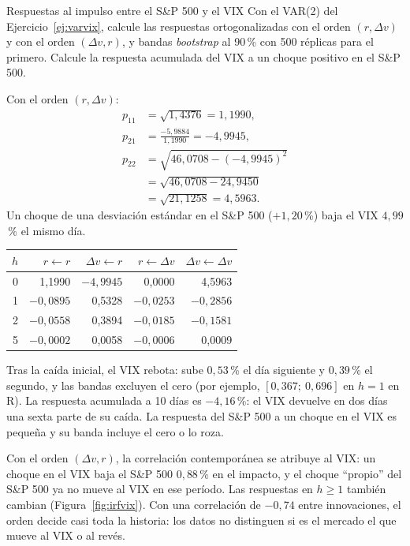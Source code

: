 \begin{ejresuelto}{Respuestas al impulso entre el S\&P 500 y el VIX}\label{ej:irfvix}
\enunciado Con el VAR(2) del Ejercicio~\ref{ej:varvix}, calcule las respuestas ortogonalizadas con el orden
$(r,\Delta v)$ y con el orden $(\Delta v,r)$, y bandas \emph{bootstrap} al 90\,\% con 500 réplicas para el
primero. Calcule la respuesta acumulada del VIX a un choque positivo en el S\&P 500.

\solucion
{} Con el orden $(r,\Delta v)$:
\begin{align*}
  p_{11} &= \sqrt{1{,}4376}=1{,}1990,\\
  p_{21} &= \frac{-5{,}9884}{1{,}1990}=-4{,}9945,\\
  p_{22} &= \sqrt{46{,}0708-(-4{,}9945)^2}\\
         &= \sqrt{46{,}0708-24{,}9450}\\
         &= \sqrt{21{,}1258}=4{,}5963 .
\end{align*}
Un choque de una desviación estándar en el S\&P 500 ($+1{,}20$\,\%) baja el VIX $4{,}99$\,\% el mismo día.

\begin{center}\small
\begin{tabular}{@{}rrrrr@{}}
\toprule
$h$ & $r\leftarrow r$ & $\Delta v\leftarrow r$ & $r\leftarrow\Delta v$ & $\Delta v\leftarrow\Delta v$ \\
\midrule
0  & 1,1990 & $-4{,}9945$ & 0,0000 & 4,5963 \\
1  & $-0{,}0895$ & 0,5328 & $-0{,}0253$ & $-0{,}2856$ \\
2  & $-0{,}0558$ & 0,3894 & $-0{,}0185$ & $-0{,}1581$ \\
5  & $-0{,}0002$ & 0,0058 & $-0{,}0006$ & 0,0009 \\
\bottomrule
\end{tabular}
\end{center}
Tras la caída inicial, el VIX rebota: sube $0{,}53$\,\% el día siguiente y $0{,}39$\,\% el segundo, y las bandas
excluyen el cero (por ejemplo, $[0{,}367;\ 0{,}696]$ en $h=1$ en R). La respuesta acumulada a 10 días es
$-4{,}16$\,\%: el VIX devuelve en dos días una sexta parte de su caída. La respuesta del S\&P 500 a un choque en
el VIX es pequeña y su banda incluye el cero o lo roza.

 Con el orden $(\Delta v,r)$, la correlación contemporánea se atribuye al VIX:
un choque en el VIX baja el S\&P 500 $0{,}88$\,\% en el impacto, y el choque ``propio'' del S\&P 500 ya no mueve
al VIX en ese período. Las respuestas en $h\ge1$ también cambian (Figura~\ref{fig:irfvix}). Con una correlación de
$-0{,}74$ entre innovaciones, el orden decide casi toda la historia: los datos no distinguen si es el mercado el
que mueve al VIX o al revés.


\end{ejresuelto}
